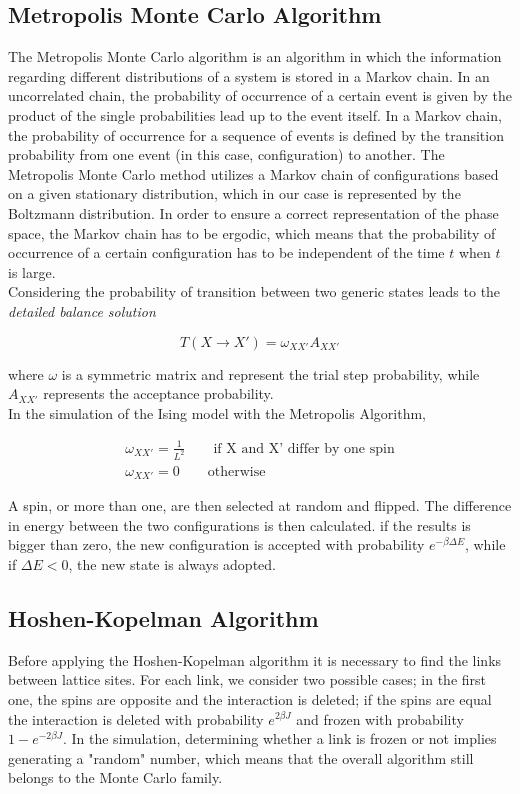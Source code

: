\documentclass[twoside]{article}
\begin{document}
\begin{multicols}{2}
\subsection{Metropolis Monte Carlo Algorithm}
The Metropolis Monte Carlo algorithm is an algorithm in which the information regarding different distributions of a system is stored in a Markov chain. 
In an uncorrelated chain, the probability of occurrence of a certain event is given by the product of the single probabilities lead up to the event itself. In a Markov chain, the probability of occurrence for a sequence of events is defined by the transition probability from one event (in this case, configuration) to another.
The Metropolis Monte Carlo method utilizes a Markov chain of configurations based on a given stationary distribution, which in our case is represented by the Boltzmann distribution. In order to ensure a correct representation of the phase space, the Markov chain has to be ergodic, which means that the probability of occurrence of a certain configuration has to be independent of the time $t$ when $t$ is large. \\
Considering the probability of transition between two generic states leads to the \emph{detailed balance solution}

\begin{equation}
T(X \rightarrow X') = \omega_{XX'}A_{XX'}
\end{equation}

where \textbf{$\omega$} is a symmetric matrix and represent the trial step probability, while $A_{XX'}$ represents the acceptance probability. \\
In the simulation of the Ising model with the Metropolis Algorithm, 

\begin{align}
\omega_{XX'} = \frac{1}{L^2} \qquad \text{if X and X' differ by one spin} \\
\omega_{XX'} = 0 \qquad  \text{otherwise} 
\end{align}

A spin, or more than one, are then selected at random and flipped. The difference in energy between the two configurations is then calculated. if the results is bigger than zero, the new configuration is accepted with probability $e^{-\beta\Delta E}$, while if $\Delta E < 0$, the new state is always adopted.

\subsection{Hoshen-Kopelman Algorithm} \label{hk_al}
Before applying the Hoshen-Kopelman algorithm it is necessary to find the links between lattice sites. For each link, we consider two possible cases; in the first one, the spins are opposite and the interaction is deleted; if the spins are equal the interaction is deleted with probability $e^{2\beta J}$ and frozen with probability $1-e^{-2\beta J}$.
In the simulation, determining whether a link is frozen or not implies generating a "random" number, which means that the overall algorithm still belongs to the Monte Carlo family. 


\end{multicols}
\end{document}
